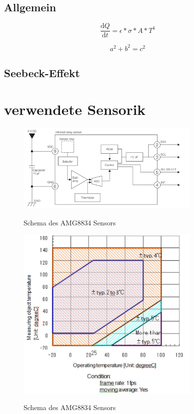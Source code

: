 \subsection{Allgemein}

\begin{equation}
\label{eq2}
\frac{\mathrm{d} Q}{\mathrm{d} t} = \epsilon *\sigma * A * T^4
\end{equation}

\begin{equation}
\label{eq1}
a^2+b^2=c^2
\end{equation}


\subsection{Seebeck-Effekt}




\section{verwendete Sensorik}


\begin{figure}[H]
	\centering
	\includegraphics[width=0.8\textwidth]
	{fig/Circuit_AMG8834.PNG}
	\caption[Schema des AMG8834 Sensors]{Schema des AMG8834 Sensors} \protect\cite{AMG8834}
	\label{fig:angleVLP}
\end{figure}


\begin{figure}[H]
	\centering
	\includegraphics[width=0.8\textwidth]
	{fig/accuracy.PNG}
	\caption[Schema des AMG8834 Sensors]{Schema des AMG8834 Sensors} \protect\cite{AMG8834}
	\label{fig:angleVLP}
\end{figure}
